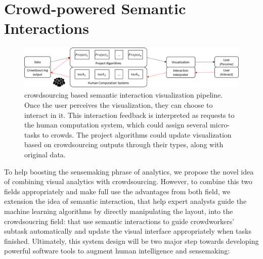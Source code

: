 \documentclass[journal]{vgtc}                %
\begin{document}
\section{Crowd-powered Semantic Interactions}

\begin{figure}
 \centering %
  \includegraphics[width=\textwidth]{Pipeline}
 \caption{crowdsourcing based semantic interaction visualization pipeline.
 Once the user perceives the visualization, they can choose to interact in it.
 This interaction feedback is interpreted as requests to the human computation system, which could assign several micro-tasks to crowds.
 The project algorithms could update visualization based on crowdsourcing outputs through their types, along with original data.
	 }
 \label{fig:pipeline}
\end{figure}


To help boosting the sensemaking phrase of analytics, we propose the novel idea of combining visual analytics with crowdsourcing.
However, to combine this two fields appropriately and make full use the advantages from both field, we extension the idea of semantic interaction, that help expert analysts guide the machine learning algorithms by directly manipulating the layout, into the crowdsoucring field: that use semantic interactions to guide crowdworkers' subtask automatically and update the visual interface appropriately when tasks finished.
Ultimately, this system design will be two major step towards developing powerful software tools to augment human intelligence and sensemaking:
\end{document}
